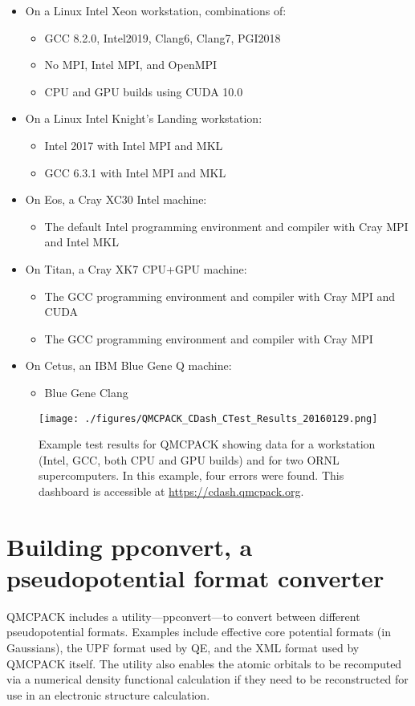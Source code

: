 \begin{itemize}
\item On a Linux Intel Xeon workstation, combinations of:
  \begin{itemize}
  \item GCC 8.2.0, Intel2019, Clang6, Clang7, PGI2018
  \item No MPI, Intel MPI, and OpenMPI
  \item CPU and GPU builds using CUDA 10.0
  \end{itemize}
\item On a Linux Intel Knight's Landing workstation:
  \begin{itemize}
  \item Intel 2017 with Intel MPI and MKL
  \item GCC 6.3.1 with Intel MPI and MKL
  \end{itemize}
\item On Eos, a Cray XC30 Intel machine:
  \begin{itemize}
\item The default Intel programming environment and compiler with Cray MPI and Intel MKL
  \end{itemize}
\item On Titan, a Cray XK7 CPU+GPU machine:
  \begin{itemize}
  \item The GCC programming environment and compiler with Cray MPI and CUDA
  \item The GCC programming environment and compiler with Cray MPI
  \end{itemize}
\item On Cetus, an IBM Blue Gene Q machine:
\begin{itemize}
\item Blue Gene Clang
\end{itemize}
\end{itemize}

\begin{figure}
  \centering
  \texttt{[image: ./figures/QMCPACK\_CDash\_CTest\_Results\_20160129.png]}
  \caption{Example test results for QMCPACK showing data for a
    workstation (Intel, GCC, both CPU and GPU builds) and for two ORNL
    supercomputers. In this example, four errors were found. This
    dashboard is accessible at \url{https://cdash.qmcpack.org}.}
\end{figure}

\section{Building ppconvert, a pseudopotential format converter}
\label{sec:buildppconvert}
QMCPACK includes a utility---ppconvert---to convert between different
pseudopotential formats. Examples include effective core potential
formats (in Gaussians), the UPF format used by QE, and
the XML format used by QMCPACK itself. The utility also enables the
atomic orbitals to be recomputed via a numerical density functional
calculation if they need to be reconstructed for use in an
electronic structure calculation.

